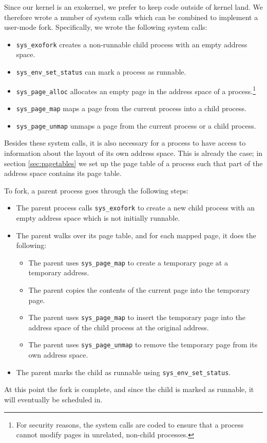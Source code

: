 \documentclass{report}
\begin{document}
Since our kernel is an exokernel, we prefer to keep code outside of kernel
land. We therefore wrote a number of system calls which can be combined to
implement a user-mode fork. Specifically, we wrote the following system calls:
\begin{itemize}
\item	\texttt{sys\_exofork} creates a non-runnable child process with an empty address space.
\item	\texttt{sys\_env\_set\_status} can mark a process as runnable.
\item	\texttt{sys\_page\_alloc} allocates an empty page in the address space
of a process.\footnote{For security reasons, the system calls are coded to
ensure that a process cannot modify pages in unrelated, non-child processes.}
\item	\texttt{sys\_page\_map} maps a page from the current process into a child process.
\item	\texttt{sys\_page\_unmap} unmaps a page from the current process or a child process.
\end{itemize}

Besides these system calls, it is also necessary for a process to have access
to information about the layout of its own address space. This is already the
case; in section \ref{sec:pagetables} we set up the page table of a process
such that part of the address space contains its page table.

To fork, a parent process goes through the following steps:
\begin{itemize}
\item The parent process calls \texttt{sys\_exofork} to create a new child
process with an empty address space which is not initially runnable.
\item The parent walks over its page table, and for each mapped page, it does
the following:
\begin{itemize}
\item The parent uses \texttt{sys\_page\_map} to create a temporary page at a
temporary address.
\item The parent copies the contents of the current page into the temporary
page.
\item The parent uses \texttt{sys\_page\_map} to insert the temporary page
into the address space of the child process at the original address.
\item The parent uses \texttt{sys\_page\_unmap} to remove the temporary page
from its own address space.
\end{itemize}
\item The parent marks the child as runnable using
\texttt{sys\_env\_set\_status}. 
\end{itemize}
At this point the fork is complete, and since the child is marked as runnable,
it will eventually be scheduled in.
\end{document}
